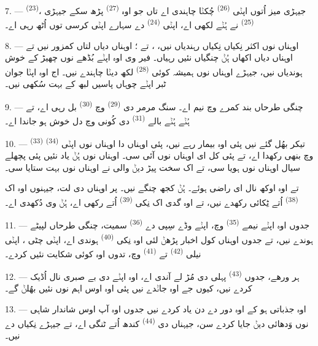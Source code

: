 7. ---  \textsuperscript{(23)}، جیہڑی میز اُتوں اپݨی
 \textsuperscript{(26)} چُکݨا چاہندی اے تاں جو اوہ 
\textsuperscript{(27)} پڑھ سکے جیہڑی  \textsuperscript{(25)} نے ہُݨے
لکھی اے، اپݨی  \textsuperscript{(24)} دے سہارے اپݨی کرسی توں اُٹھ
رہی اے۔

8. --- اوہناں نوں اکثر نِکیاں نِکیاں  رہندیاں نیں،
،  تے ؛ اوہناں دیاں لتاں کمزور نیں
تے اوہناں دیاں اکھاں ہُݨ چنگیاں نئیں رہیاں۔ فیر وی اوہ اپݨے بُڈھے
 نوں چھیڑ کے خوش ہوندیاں نیں، جیہڑے اوہناں نوں ہمیشہ کوئی
 \textsuperscript{(28)} لکھ دیݨا چاہندے نیں۔ اج اوہ اپݨا جوان ٹبر
اپݨے چوہاں پاسیں لبھ کے بہت سُکھی نیں۔

9. --- چنگی طرحاں بند کمرے وچ نیم اے۔ سنگ مرمر دی 
\textsuperscript{(29)} وچ  \textsuperscript{(30)} بل رہی اے، تے
ہُݨے ہُݨے بالے  \textsuperscript{(31)} دی کُونی  وچ دل
خوش ہو جاندا اے۔

\VUsaut{4.2mm}
\VUsaut{3.0mm}

10. ---  \textsuperscript{(33)} تیکر بھُل گئے نیں پئی اوہ بیمار رہے
نیں، پئی اوہناں دا  اوہناں نوں اپݨی 
\textsuperscript{(34)} وچ بنھی رکھدا اے، تے پئی کل ای اوہناں نوں
 آئی سی۔ اوہناں نوں ہُݨ یاد نئیں پئی پچھلے سیال اوہناں نوں
 ہویا سی، تے اک سخت پیڑ دیݨ والی  نے اوہناں نوں بہت
ستایا سی۔

تے اوہ اوکھ نال ای راضی ہوئے۔ ہُݨ کجھ چنگے نیں۔ پر اوہناں دی لت، جیہنوں اوہ اک
 \textsuperscript{(38)} اُتے ٹِکائی رکھدے نیں، تے اوہ گدی اک نِکی
 \textsuperscript{(39)} اُتے رکھی اے، ہُݨ وی دُکھدی اے۔

11. --- جدوں اوہ اپݨے نیمے  \textsuperscript{(35)} وچ، اپݨے
وڈے سِپی دے  \textsuperscript{(36)} سمیت، چنگی طرحاں لپیٹے ہوندے
نیں، تے جدوں اوہناں کول اخبار پڑھݨ لئی اوہ نِکی 
\textsuperscript{(40)} ہوندی اے، اپݨی چٹی ، اپݨی نیلی
 \textsuperscript{(42)} تے  \textsuperscript{(41)} وچ،
تدوں اوہ کوئی شکایت نئیں کردے۔

12. --- ہر ورھے، جدوں  \textsuperscript{(43)} پہلی 
دی  مُڑ لے آندی اے، اوہ اپݨے  دی بے صبری نال اُڈیک
کردے نیں، کیوں جے اوہ جاݨدے نیں پئی اوہ اوس اہم  نوں نئیں بھُلݨ
گے۔

13. --- اوہ جذباتی ہو کے اوہ دور دے دن یاد کردے نیں جدوں اوہ آپ اوس شاندار شاہی
 نوں وَدھائی دیݨ جایا کردے سن، جیہناں دی 
\textsuperscript{(44)} کندھ اُتے ٹنگی اے، تے جیہڑے نِکیاں دے  نیں۔
\VUsaut{6.0mm}
\VUfilet{22mm}

